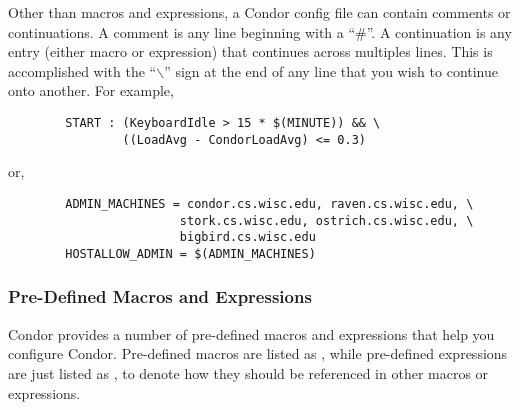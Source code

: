 Other than macros and expressions, a Condor config file can contain
comments or continuations.  A comment is any line beginning with a
``\#''.  A continuation is any entry (either macro or expression) that
continues across multiples lines.  This is accomplished with the
``$\backslash$'' sign at the end of any line that you wish to continue onto
another.  For example,
\begin{verbatim}
        START : (KeyboardIdle > 15 * $(MINUTE)) && \
                ((LoadAvg - CondorLoadAvg) <= 0.3)
\end{verbatim}
or,
\begin{verbatim}
        ADMIN_MACHINES = condor.cs.wisc.edu, raven.cs.wisc.edu, \
                        stork.cs.wisc.edu, ostrich.cs.wisc.edu, \
                        bigbird.cs.wisc.edu
        HOSTALLOW_ADMIN = $(ADMIN_MACHINES)
\end{verbatim}

\subsubsection{\label{sec:Pre-Defined-Macros-and-Expressions}
Pre-Defined Macros and Expressions}

Condor provides a number of pre-defined macros and expressions that
help you configure Condor.  Pre-defined macros are listed as
, while pre-defined expressions are just listed as
\Expr{expression\_name}, to denote how they should be referenced in
other macros or expressions.


